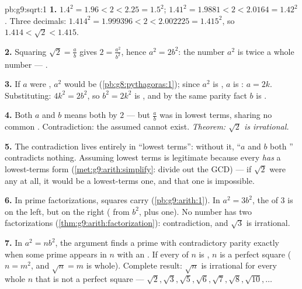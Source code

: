 \begin{solution}{pb:g9:sqrt:1}
\textbf{1.} $1.4^2 = 1.96 < 2 < 2.25 = 1.5^2$;
$1.41^2 = 1.9881 < 2 < 2.0164 = 1.42^2$. Three decimals:
$1.414^2 = 1.999396 < 2 < 2.002225 = 1.415^2$, so
$1.414 < \sqrt2 < 1.415$.

\textbf{2.} Squaring $\sqrt2 = \frac ab$ gives
$2 = \frac{a^2}{b^2}$, hence $a^2 = 2b^2$: the number $a^2$ is
twice a whole number --- \emph{}.

\textbf{3.} If $a$ were , $a^2$ would be 
(\cref{pb:g8:pythagoras:1}); since $a^2$ is , $a$ is :
$a = 2k$. Substituting: $4k^2 = 2b^2$, so $b^2 = 2k^2$ is ,
and by the same parity fact $b$ is .

\textbf{4.} Both $a$ and $b$  means both  by $2$
--- but $\frac ab$ was in lowest terms, sharing no common
. Contradiction: the assumed  cannot exist.
\emph{Theorem: $\sqrt2$ is irrational.}

\textbf{5.} The contradiction lives entirely in ``lowest
terms'': without it, ``$a$ and $b$ both '' contradicts
nothing. Assuming lowest terms is legitimate because every
 \emph{has} a lowest-terms form
(\cref{met:g9:arith:simplify}: divide out the GCD) --- if
$\sqrt2$ were any  at all, it would be a lowest-terms
one, and that one is impossible.

\textbf{6.} In prime factorizations, squares carry 
 (\cref{pb:g9:arith:1}). In $a^2 = 3b^2$, the 
of $3$ is  on the left, but  on the right ( from
$b^2$, plus one). No number has two factorizations
(\cref{thm:g9:arith:factorization}): contradiction, and
$\sqrt3$ is irrational.

\textbf{7.} In $a^2 = n b^2$, the argument finds a prime with
contradictory  parity exactly when some prime appears in
$n$ with an \emph{} . If every  of $n$ is
, $n$ is a perfect square ($n = m^2$, and
$\sqrt n = m$ is whole). Complete result: $\sqrt n$ is
irrational for every whole $n$ that is not a perfect square ---
$\sqrt2, \sqrt3, \sqrt5, \sqrt6, \sqrt7, \sqrt8, \sqrt{10},
\dots$


\end{solution}
